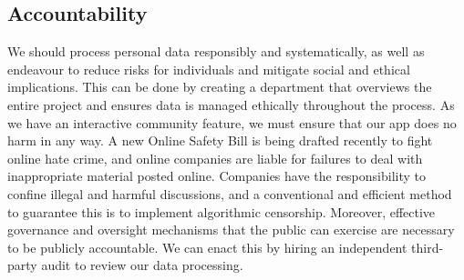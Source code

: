 \subsection{Accountability} 
We should process personal data responsibly and systematically, as well as endeavour to reduce risks for individuals and mitigate social and ethical implications. 
This can be done by creating a department that overviews the entire project and ensures data is managed ethically throughout the process. As we have an interactive community 
feature, we must ensure that our app does no harm in any way. A new Online Safety Bill is being drafted recently to fight online hate crime, and online companies are liable for failures to
deal with inappropriate material posted online.  Companies have the responsibility to confine illegal and harmful discussions, and a conventional and efficient method
to guarantee this is to implement algorithmic censorship. 
Moreover, effective governance and oversight mechanisms that the public can exercise are necessary to be publicly accountable. 
We can enact this by hiring an independent third-party audit to review our data processing.

